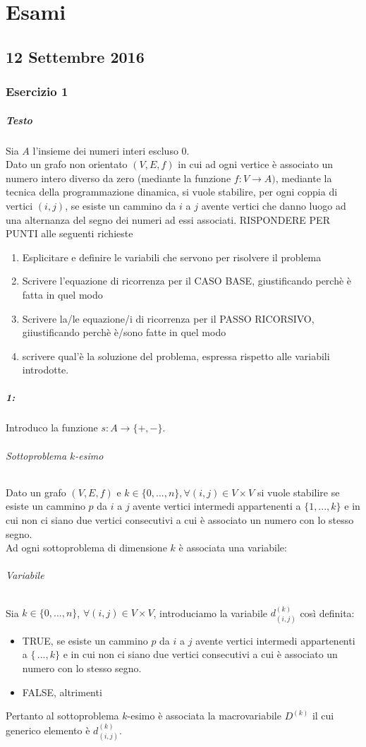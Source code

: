 \documentclass[12pt, a4paper, openany]{book}
\begin{document}
\chapter{Esami}
\section{12 Settembre 2016}
\subsection{Esercizio 1}
\paragraph*{Testo}Sia $A$ l'insieme dei numeri interi escluso 0.
\\Dato un grafo non orientato $(V,E,f)$ in cui ad ogni vertice è associato un numero intero diverso da zero
(mediante la funzione $f: V\to A)$, mediante la tecnica della programmazione dinamica, si vuole stabilire, per ogni coppia di vertici $(i,j)$,
se esiste un cammino da $i$ a $j$ avente vertici che danno luogo ad una alternanza del segno dei numeri ad essi associati.
RISPONDERE PER PUNTI alle seguenti richieste
\begin{enumerate}
	\item Esplicitare e definire le variabili che servono per risolvere il problema
	\item Scrivere l'equazione di ricorrenza per il CASO BASE, giustificando perchè è fatta in quel modo
	\item Scrivere la/le equazione/i di ricorrenza per il PASSO RICORSIVO, giiustificando perchè è/sono fatte in quel modo
	\item scrivere qual'è la soluzione del problema, espressa rispetto alle variabili introdotte.
\end{enumerate}

\paragraph*{1:} 
Introduco la funzione $s: A\to \{+,-\}$.
\subparagraph*{Sottoproblema $k$-esimo}
Dato un grafo $(V,E,f)$ e $k\in \{0,...,n\}, \forall(i,j) \in V\times V$ si vuole stabilire se esiste un cammino $p$
da $i$ a $j$ avente vertici intermedi appartenenti a $\{1,...,k\}$ e in cui non ci siano due vertici consecutivi a cui è associato un numero con lo stesso segno.
\\Ad ogni sottoproblema di dimensione $k$ è associata una variabile:  
\subparagraph*{Variabile}
Sia $k\in\{0,...,n\}$, $\forall (i,j) \in V\times V$, introduciamo la variabile $d^{(k)}_{(i,j)}$ così definita:
\begin{itemize}
	\item TRUE, se esiste un cammino $p$ da $i$ a $j$ avente vertici intermedi appartenenti a $\{\,...,k\}$ e in cui non ci siano due vertici consecutivi a cui è associato un numero con lo stesso segno.
	\item FALSE, altrimenti
\end{itemize}
Pertanto al sottoproblema $k$-esimo è associata la macrovariabile $D^{(k)}$ il cui generico elemento è $d^{(k)}_{(i,j)}$.
\end{document}
